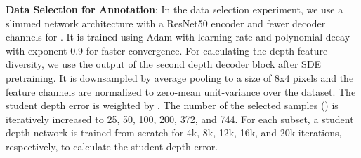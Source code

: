\documentclass[final]{cvpr}
\begin{document}
\noindent\textbf{Data Selection for Annotation}:
In the data selection experiment, we use a slimmed network architecture with a ResNet50 encoder and fewer decoder channels for . It is trained using Adam with  learning rate and polynomial decay with exponent 0.9 for faster convergence.
For calculating the depth feature diversity, we use the output of the second depth decoder block after SDE pretraining. It is downsampled by average pooling to a size of 8x4 pixels and the feature channels are normalized to zero-mean unit-variance over the dataset. The student depth error is weighted by . The number of the selected samples () is iteratively increased to 25, 50, 100, 200, 372, and 744.
For each subset, a student depth network is trained from scratch for 4k, 8k, 12k, 16k, and 20k iterations, respectively, to calculate the student depth error.
\end{document}
